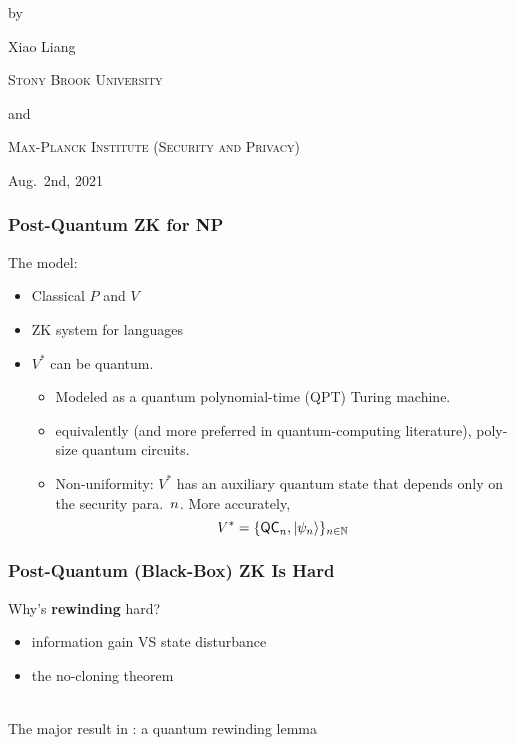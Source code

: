 \documentclass[aspectratio=1610, 12pt, xcolor={dvipsnames}]{beamer}
\begin{document}
 

{ %
\begin{frame}
\vspace{4em}
\centerline{\Large{}}
\vspace{3em}
\centerline{}
\vspace{1em}
\centerline{by}
\vspace{1em}
\centerline{Xiao Liang}
\vspace{2em}
\centerline{\small\textsc{Stony Brook University}}
\centerline{\small and}
\centerline{\small\textsc{Max-Planck Institute (Security and Privacy)}}
\vspace{1em}
\centerline{\small Aug.\ 2nd, 2021}
\end{frame}
}

\begin{frame}
\frametitle{Post-Quantum ZK for NP}

The model:
\begin{itemize}
\item
Classical $P$ and $V$
\item
ZK system for \NP languages
\item
$V^*$ can be quantum. 
\begin{itemize}
\item
Modeled as a quantum polynomial-time (QPT) Turing machine.
\item
equivalently (and more preferred in quantum-computing literature), poly-size quantum circuits. 
\item 
Non-uniformity: $V^*$ has an auxiliary quantum state that depends only on the security para.\ $n$. More accurately,
$$V^* = \{\mathsf{QC}_n, \ket{\psi_n}\}_{n\in \mathbb{N}}$$
\end{itemize}
\end{itemize}
\end{frame}


\begin{frame}
\frametitle{Post-Quantum (Black-Box) ZK Is Hard}

Why's {\bf rewinding} hard?
\begin{itemize}
\item
    information gain VS state disturbance
\item
 the no-cloning theorem
\end{itemize}
~\\
The major result in \cite{DBLP:conf/stoc/Watrous06}: a quantum rewinding lemma 
\end{frame}
\end{document}
